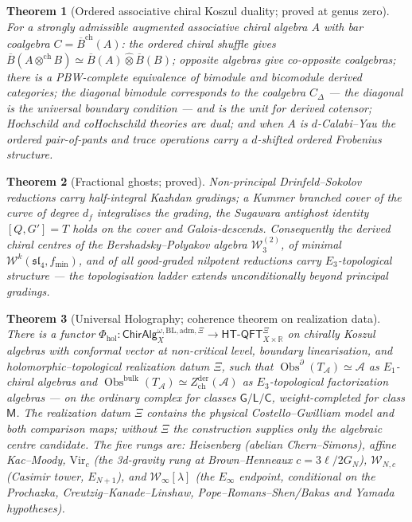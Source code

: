 \documentclass[11pt]{article}
\providecommand{\cA}{\mathcal{A}}
\providecommand{\cW}{\mathcal{W}}
\providecommand{\bR}{\mathbb{R}}
\providecommand{\fsl}{\mathfrak{sl}}
\providecommand{\barB}{\overline{B}}
\providecommand{\Vir}{\mathrm{Vir}}
\providecommand{\Zder}{Z^{\mathrm{der}}_{\mathrm{ch}}}
\providecommand{\Obs}{\operatorname{Obs}}
\newtheorem{theorem}{Theorem}[section]
\begin{document}
\begin{theorem}[Ordered associative chiral Koszul duality; proved at
genus zero]\label{thm:ordered}
For a strongly admissible augmented associative chiral algebra $A$ with
bar coalgebra $C=\barB^{\mathrm{ch}}(A)$: the ordered chiral shuffle
gives $\barB(A\otimes^{\mathrm{ch}}B)\simeq\barB(A)\widehat\otimes
\barB(B)$; opposite algebras give co-opposite coalgebras; there is a
PBW-complete equivalence of bimodule and bicomodule derived categories;
the diagonal bimodule corresponds to the coalgebra $C_\Delta$ --- the
diagonal is the universal boundary condition --- and is the unit for
derived cotensor; Hochschild and coHochschild theories are dual; and
when $A$ is $d$-Calabi--Yau the ordered pair-of-pants and trace
operations carry a $d$-shifted ordered Frobenius structure.
\end{theorem}

\begin{theorem}[Fractional ghosts; proved]\label{thm:frghost}
Non-principal Drinfeld--Sokolov reductions carry half-integral Kazhdan
gradings; a Kummer branched cover of the curve of degree $d_f$
integralises the grading, the Sugawara antighost identity
$[Q,G']=T$ holds on the cover and Galois-descends. Consequently the
derived chiral centres of the Bershadsky--Polyakov algebra
$\cW^{(2)}_3$, of minimal $\cW^k(\fsl_4,f_{\min})$, and of \emph{all}
good-graded nilpotent reductions carry $E_3$-topological structure ---
the topologisation ladder extends unconditionally beyond principal
gradings.
\end{theorem}

\begin{theorem}[Universal Holography; coherence theorem on realization
data]\label{thm:holography}
There is a functor
$\Phi_{\mathrm{hol}}\colon\mathsf{ChirAlg}^{\omega,\mathrm{BL},
\mathrm{adm},\Xi}_X\to\mathsf{HT\text{-}QFT}^{\Xi}_{X\times\bR}$
on chirally Koszul algebras with conformal vector at non-critical
level, boundary linearisation, and holomorphic--topological
realization datum $\Xi$, such that
$\Obs^\partial(T_\cA)\simeq\cA$ as $E_1$-chiral algebras and
$\Obs^{\mathrm{bulk}}(T_\cA)\simeq\Zder(\cA)$ as $E_3$-topological
factorization algebras --- on the ordinary complex for classes
$\mathsf G/\mathsf L/\mathsf C$, weight-completed for class $\mathsf M$.
The realization datum $\Xi$ \emph{contains} the physical
Costello--Gwilliam model and both comparison maps; without $\Xi$ the
construction supplies only the algebraic centre candidate. The five
rungs are: Heisenberg \textup{(abelian Chern--Simons)}, affine
Kac--Moody, $\Vir_c$ \textup{(the 3d-gravity rung at Brown--Henneaux
$c=3\ell/2G_N$)}, $\cW_{N,c}$ \textup{(Casimir tower, $E_{N+1}$)}, and
$\cW_\infty[\lambda]$ \textup{(the $E_\infty$ endpoint, conditional on
the Prochazka, Creutzig--Kanade--Linshaw, Pope--Romans--Shen/Bakas and
Yamada hypotheses)}.
\end{theorem}
\end{document}
